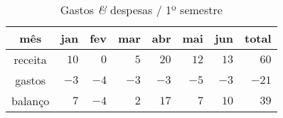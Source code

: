 \begin{table}\centering
  \caption{Gastos {\it \&} despesas / 1º semestre}

  \begin{tabular}{crrrrrrr}
    mês & jan & fev & mar & abr & mai & jun & total\\
    \hline
  receita & $10$ & $0$ & $5$ & $20$ & $12$ & $13$ & $60$\\
  gastos  & $-3$ & $-4$ & $-3$ & $-3$ & $-5$ & $-3$ & $-21$ \\
  \hline
  balanço & $7$ & $-4$ & $2$ & $17$ & $7$ & $10$ & $39$\\
  \end{tabular}
\end{table}
